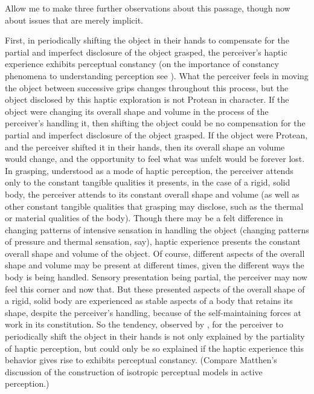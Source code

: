 Allow me to make three further observations about this passage, though now about issues that are merely implicit.

First, in periodically shifting the object in their hands to compensate for the partial and imperfect disclosure of the object grasped, the perceiver's haptic experience exhibits perceptual constancy (on the importance of constancy phenomena to understanding perception see \citealt{Smith:2002sa,Burge:2010uq}). What the perceiver feels in moving the object between successive grips changes throughout this process, but the object disclosed by this haptic exploration is not Protean in character. If the object were changing its overall shape and volume in the process of the perceiver's handling it, then shifting the object could be no compensation for the partial and imperfect disclosure of the object grasped. If the object were Protean, and the perceiver shifted it in their hands, then its overall shape an volume would change, and the opportunity to feel what was unfelt would be forever lost. In grasping, understood as a mode of haptic perception, the perceiver attends only to the constant tangible qualities it presents, in the case of a rigid, solid body, the perceiver attends to its constant overall shape and volume (as well as other constant tangible qualities that grasping may disclose, such as the thermal or material qualities of the body). Though there may be a felt difference in changing patterns of intensive sensation in handling the object  (changing patterns of pressure and thermal sensation, say), haptic experience presents the constant overall shape and volume of the object. Of course, different aspects of the overall shape and volume may be present at different times, given the different ways the body is being handled. Sensory presentation being partial, the perceiver may now feel this corner and now that. But these presented aspects of the overall shape of a rigid, solid body are experienced as stable aspects of a body that retains its shape, despite the perceiver's handling, because of the self-maintaining forces at work in its constitution. So the tendency, observed by \citet{Lederman:1987fr}, for the perceiver to periodically shift the object in their hands is not only explained by the partiality of haptic perception, but could only be so explained if the haptic experience this behavior gives rise to exhibits perceptual constancy. (Compare Matthen's \citeyear{Matthen:2015bq} discussion of the construction of isotropic perceptual models in active perception.)

